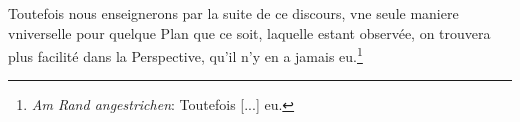 \pend \pstart [p.~77] Toutefois nous enseignerons par la suite de ce discours, vne seule maniere vniverselle pour quelque Plan que ce soit, laquelle estant observ\'{e}e, on trouvera plus facilit\'{e} dans la Perspective\protect{}, qu'il n'y en a jamais eu.\footnote{\textit{Am Rand angestrichen}: Toutefois [...] eu.}